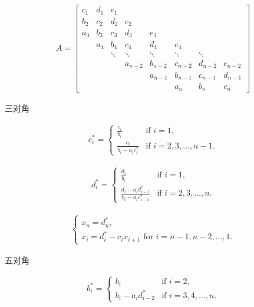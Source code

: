 \documentclass[a4paper,10pt]{article}
\begin{document}
\begin{align}
    A = \begin{bmatrix}
        c_{1} & d_{1} & e_{1} & & & & \\
        b_{2} & c_{2} & d_{2} & e_{2} & & & \\
        a_{3} & b_{3} & c_{3} & d_{3} & e_{3} & & \\
        & a_{4} & b_{4} & c_{4} & d_{4} & e_{4} & \\
        & & \ddots & \ddots & \ddots & \ddots & \ddots \\
        & & & a_{n-2} & b_{n-2} & c_{n-2} & d_{n-2} & e_{n-2} \\
        & & & & a_{n-1} & b_{n-1} & c_{n-1} & d_{n-1} \\
        & & & & & a_{n} & b_{n} & c_{n}
    \end{bmatrix}
\end{align}


三对角


\begin{align}
    c^{*}_{i} = 
    \begin{cases}
        \frac{c_{i}}{b_{i}} & \text{if }i = 1, \\
        \frac{c_{i}}{b_{i}-a_{i}c^{*}_{i}} &  \text{if }i = 2,3,\ldots,n-1.
    \end{cases}
\end{align}

\begin{align}
    d^{*}_{i} =
    \begin{cases}
        \frac{d_{i}}{b_{i}} & \text{if }i = 1, \\
        \frac{d_{i}-a_{i}d^{*}_{i-1}}{b_{i}-a_{i}c^{*}_{i-1}} & \text{if }i = 2,3,\ldots,n.
    \end{cases}
\end{align}

\begin{align}
    \begin{cases}
        x_{n} = d^{*}_{n}, \\
        x_{i} = d^{*}_{i}-c_{i}x_{i+1} \text{ for } i = n-1,n-2,\ldots,1.    
    \end{cases}
\end{align}


五对角


\begin{align}
    b^{*}_{i} = 
    \begin{cases}
        b_{i} & \text{if }i = 2, \\
        b_{i} - a_{i}d^{*}_{i-2} &  \text{if }i = 3,4,\ldots,n.
    \end{cases}
\end{align}
\end{document}
